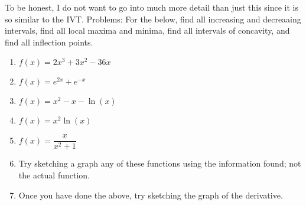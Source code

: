 \documentclass[10pt]{article}
\theoremstyle{Theorem}
\theoremstyle{definition}
\theoremstyle{remark}
\theoremstyle{custom}
\begin{document}
To be honest, I do not want to go into much more detail than just this since it is so similar to the IVT.
\newpage
\noindent Problems: For the below, find all increasing and decreaaing intervals, find all local maxima and minima, find all intervals of concavity, and find all inflection points.
\begin{enumerate}[1.]
\item $f(x)=2x^3+3x^2-36x$
\item $f(x)=e^{2x}+e^{-x}$
\item $f(x)=x^2-x-\ln(x)$
\item $f(x)=x^2\ln(x)$
\item $f(x)=\dfrac{x}{x^2+1}$
\item Try sketching a graph any of these functions using the information found; not the actual function. 
\item Once you have done the above, try sketching the graph of the derivative.
\end{enumerate}
\end{document}
